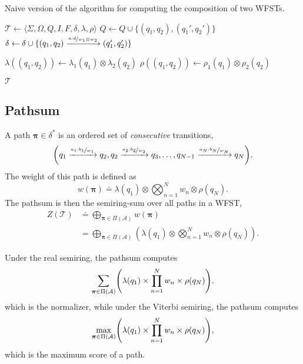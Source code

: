 \begin{algorithm}
  \caption{Naive version of the algorithm for computing the composition of
  two WFSTs.}
  \label{fig:naive-composition}

  \begin{algorithmic}[1]
      \State $\mathcal{T} \gets \langle \Sigma,\Omega,Q,I,F,\delta,\lambda,\rho \rangle$ 
            \State $Q \gets Q \cup \{(q_1,q_2),(q_1',q_2')\}$ 
            \State $\delta \gets \delta \cup \{ (q_1,q_2) \xrightarrow{\nicefrac{a:d}{w_1\otimes w_2}} (q_1',q_2') \}$ 
          \EndIf
        \EndFor
      \EndFor

       
        \State $\lambda((q_1,q_2)) \gets \lambda_1(q_1) \otimes \lambda_2(q_2)$
        \State $\rho((q_1,q_2)) \gets \rho_1(q_1) \otimes \rho_2(q_2)$
      \EndFor

      \State \Return $\mathcal{T}$
    \EndFunction
  \end{algorithmic}
\end{algorithm}

\subsection{Pathsum}

A path $\bm{\pi}\in\delta^*$ is an ordered set of \emph{consecutive}
transitions, \[
  \lft( q_1 \xrightarrow{\nicefrac{a_1:b_1}{w_1}} q_2, q_2 \xrightarrow{\nicefrac{a_2:b_2}{w_2}} q_3,\ldots, q_{N-1} \xrightarrow{\nicefrac{a_N:b_N}{w_N}} q_N \rgt)
.\]
The weight of this path is defined as \[
  w(\bm{\pi}) \doteq \lambda(q_1) \otimes \bigotimes_{n=1}^N w_n \otimes \rho(q_N)
.\]
The pathsum is then the semiring-sum over all paths in a WFST,
\begin{align*}
  Z(\mathcal{T}) &\doteq \bigoplus_{\bm{\pi}\in\Pi(\mathcal{A})} w(\bm{\pi}) \\
  &= \bigoplus_{\bm{\pi}\in\Pi(\mathcal{A})} \left( \lambda(q_1) \otimes \bigotimes_{n=1}^N w_n \otimes \rho(q_N) \right)
.\end{align*}

Under the real semiring, the pathsum computes \[
  \sum_{\bm{\pi}\in\Pi(\mathcal{A})} \lft( \lambda(q_1) \times \prod_{n=1}^N w_n \times \rho(q_N) \rgt)
,\]
which is the normalizer, while under the Viterbi semiring, the pathsum computes
\[
  \max_{\bm{\pi}\in\Pi(\mathcal{A})} \lft( \lambda(q_1) \times \prod_{n=1}^N w_n \times \rho(q_N) \rgt)
,\]
which is the maximum score of a path.

